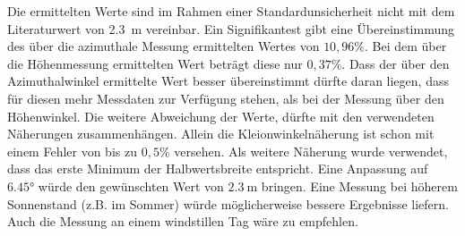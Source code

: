\documentclass[../../main.tex]{subfiles}
\begin{document}
    Die ermittelten Werte sind im Rahmen einer Standardunsicherheit nicht mit dem Literaturwert von \SI{2,3}{\metre} \cite{doc:SalsaManual} vereinbar. Ein Signifikantest gibt eine Übereinstimmung des über die azimuthale Messung ermittelten Wertes von $10,96\%$. Bei dem über die Höhenmessung ermittelten Wert beträgt diese nur $0,37\%$. Dass der über den Azimuthalwinkel ermittelte Wert besser übereinstimmt dürfte daran liegen, dass für diesen mehr Messdaten zur Verfügung stehen, als bei der Messung über den Höhenwinkel. Die weitere Abweichung der Werte, dürfte mit den verwendeten Näherungen zusammenhängen. Allein die Kleionwinkelnäherung ist schon mit einem Fehler von bis zu $0,5\%$ versehen. Als weitere Näherung wurde verwendet, dass das erste Minimum der Halbwertsbreite entspricht. Eine Anpassung auf $\ang{6,45}$ würde den gewünschten Wert von $\SI{2,3}{\metre}$ bringen. Eine Messung bei höherem Sonnenstand (z.B. im Sommer) würde möglicherweise bessere Ergebnisse liefern. Auch die Messung an einem windstillen Tag wäre zu empfehlen.

    
\end{document}
